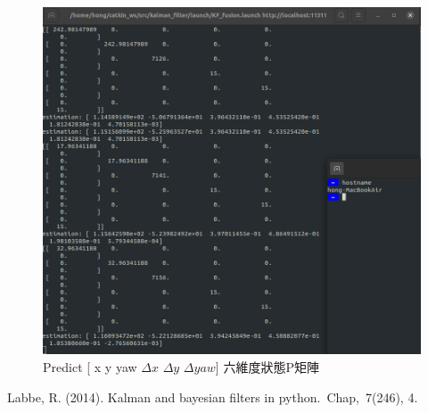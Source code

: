 \documentclass{article}
\begin{document}
\begin{figure}[H]
	\centering
	\includegraphics[scale=0.3]{./predict6.png}
	\caption{Predict [ x y yaw $\Delta{x}$ $\Delta{y}$ $\Delta{yaw}$] 六維度狀態P矩陣}
\end{figure}


\begin{thebibliography}{1}
 
    Labbe, R. (2014). Kalman and bayesian filters in python. Chap, 7(246), 4.
\end{thebibliography}
\end{document}
